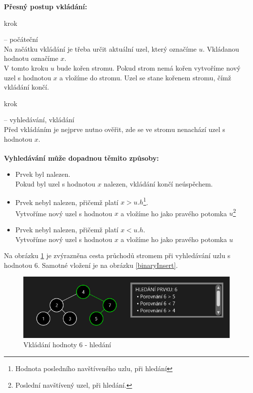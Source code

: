 \documentclass[
  biblatex=false,
  font=serif,
  glossaries=false,
  tables=false,
  theorems=false,
  index
]{kidiplom}
\makeatletter
\newcommand\footnoteref[1]{\protected@xdef\@thefnmark{\ref{#1}}\@footnotemark}
\makeatother
\begin{document}
\noindent \textbf{Přesný postup vkládání:}
\begin{enumerate} {\bfseries
\item  krok} -- počáteční \\
Na začátku vkládání je třeba určit aktuální uzel, který označíme $u$. Vkládanou hodnotu označíme $x$.\\
V tomto kroku $u$ bude kořen stromu. Pokud strom nemá kořen vytvoříme nový uzel s hodnotou $x$ a vložíme do stromu. Uzel se stane kořenem stromu, čímž vkládání končí.
{\bfseries\item  krok} -- vyhledávání, vkládání \\
Před vkládáním je nejprve nutno ověřit, zde se ve stromu nenachází uzel s hodnotou $x$.\\\\
\textbf{Vyhledávání může dopadnou těmito způsoby:}
\begin{itemize}
\item Prvek byl nalezen. \\
Pokud byl uzel s hodnotou $x$ nalezen, vkládání končí neúspěchem.
\item Prvek nebyl nalezen, přičemž platí $x > u.h$\footnote{\label{hodnotaPosledniho}Hodnota posledního navštíveného uzlu, při hledání}.\\
Vytvoříme nový uzel s hodnotou $x$ a vložíme ho jako pravého potomka $u$\footnote{\label{posledni}Poslední navštívený uzel, při hledání.}
\item Prvek nebyl nalezen, přičemž platí $x < u.h$\footnoteref{hodnotaPosledniho}.\\
Vytvoříme nový uzel s hodnotou $x$ a vložíme ho jako pravého potomka $u$\footnoteref{posledni}
\end{itemize}
\end{enumerate}

\medskip
\noindent Na obrázku \ref{binarySearchInsert} je zvýrazněna cesta průchodů stromem při vyhledávání uzlu s hodnotou 6. Samotné vložení je na obrázku \ref{binaryInsert}.

\begin{figure}[h!]
\centering
	\includegraphics[scale=0.9]{obrazky/6BinarniVkladani1.png}
	\caption{Vkládání hodnoty 6 - hledání}
	\label{binarySearchInsert}
\end{figure}
\end{document}
